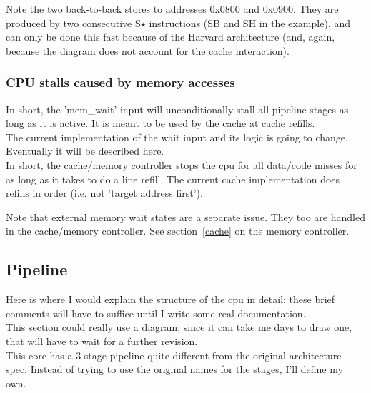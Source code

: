 \documentclass[11pt]{article}
\begin{document}
    Note the two back-to-back stores to addresses 0x0800 and 0x0900. They are
    produced by two consecutive S$\star$ instructions (SB and SH in the example),
    and can only be done this fast because of the Harvard architecture (and,
    again, because the diagram does not account for the cache interaction).\\
    
    
\subsubsection{CPU stalls caused by memory accesses}
\label{memory_cpu_stalls}

    In short, the 'mem\_wait' input will unconditionally stall all pipeline
    stages as long as it is active. It is meant to be used by the cache at cache 
    refills.\\

    The current implementation of the wait input and its logic is going
    to change. Eventually it will be described here.\\

    In short, the cache/memory controller stops the cpu for all data/code 
    misses for as long as it takes to do a line refill. The current cache 
    implementation does refills in order (i.e. not 'target address first').

    Note that external memory wait states are a separate issue. They too are 
    handled in the cache/memory controller. See section~\ref{cache} on the memory
    controller.

\subsection{Pipeline}
\label{pipeline}

    Here is where I would explain the structure of the cpu in detail; these 
    brief comments will have to suffice until I write some real documentation.\\
    
    This section could really use a diagram; since it can take me days to draw 
    one, that will have to wait for a further revision.\\
    
    This core has a 3-stage pipeline quite different from the original 
    architecture spec. Instead of trying to use the original names for the
    stages, I'll define my own.\\
    
\end{document}
